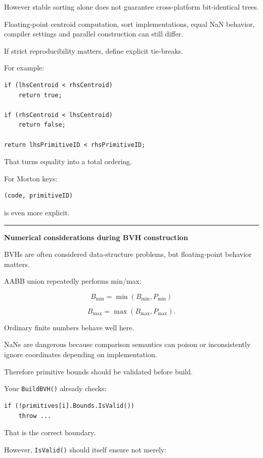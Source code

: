 However stable sorting alone does not guarantee cross-platform bit-identical trees.

Floating-point centroid computation, sort implementations, equal NaN behavior, compiler settings and parallel construction can still differ.

If strict reproducibility matters, define explicit tie-breaks.

For example:

\begin{verbatim}
if (lhsCentroid < rhsCentroid)
    return true;

if (rhsCentroid < lhsCentroid)
    return false;

return lhsPrimitiveID < rhsPrimitiveID;
\end{verbatim}

That turns equality into a total ordering.

For Morton keys:

\begin{verbatim}
(code, primitiveID)
\end{verbatim}

is even more explicit.

\begin{center}\rule{0.5\linewidth}{0.5pt}\end{center}

\textbf{Numerical considerations during BVH construction}

BVHs are often considered data-structure problems, but floating-point behavior matters.

AABB union repeatedly performs min/max:

\[
B_{\min}=\min(B_{\min},P_{\min})
\]

\[
B_{\max}=\max(B_{\max},P_{\max}).
\]

Ordinary finite numbers behave well here.

NaNs are dangerous because comparison semantics can poison or inconsistently ignore coordinates depending on implementation.

Therefore primitive bounds should be validated before build.

Your \texttt{BuildBVH()} already checks:

\begin{verbatim}
if (!primitives[i].Bounds.IsValid())
    throw ...
\end{verbatim}

That is the correct boundary.

However, \texttt{IsValid()} should itself ensure not merely:

